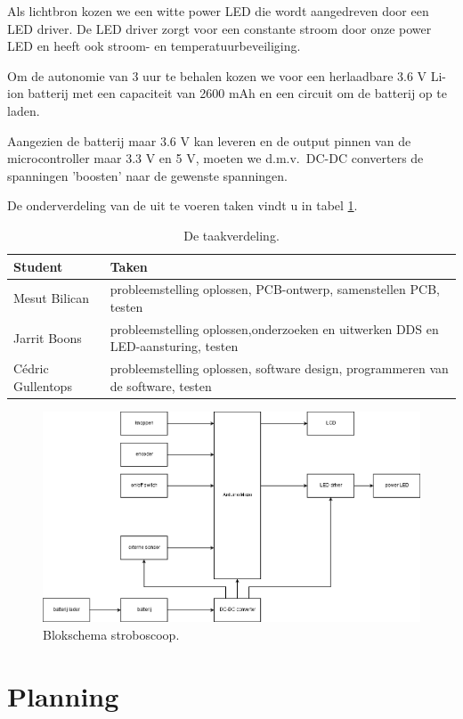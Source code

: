 \documentclass[a4paper,dutch]{article}
\begin{document}
Als lichtbron kozen we een witte power LED die wordt aangedreven door een LED driver. De LED driver zorgt voor een constante stroom door onze power LED en heeft ook stroom- en temperatuurbeveiliging.

Om de autonomie van 3 uur te behalen kozen we voor een herlaadbare 3.6 V Li-ion batterij met een capaciteit van 2600 mAh en een circuit om de batterij op te laden.

Aangezien de batterij maar 3.6 V kan leveren en de output pinnen van de microcontroller maar 3.3 V en 5 V, moeten we d.m.v.\ DC-DC converters de spanningen 'boosten' naar de gewenste spanningen.

De onderverdeling van de uit te voeren taken vindt u in tabel \ref{tab:taakverdeling}.

\begin{table}
\centering
\begin{tabular}{l|l}
Student & Taken \\\hline
Mesut Bilican & probleemstelling oplossen, PCB-ontwerp, samenstellen PCB, testen \\
Jarrit Boons & probleemstelling oplossen,onderzoeken en uitwerken DDS en LED-aansturing, testen\\
Cédric Gullentops & probleemstelling oplossen, software design, programmeren van de software, testen\\
\end{tabular}
\caption{\label{tab:taakverdeling}De taakverdeling.}
\end{table}

\begin{figure}[htbp]
\centering
\includegraphics[width=1\textwidth]{simpel.png}
\caption{\label{fig:simpel}Blokschema stroboscoop.}
\end{figure}

\section{Planning}
\end{document}

